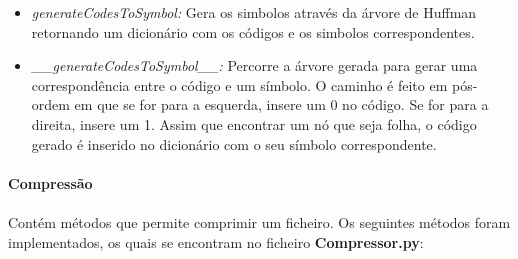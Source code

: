 \documentclass[paper=a4, fontsize=11pt]{scrartcl}
\numberwithin{equation}{section}		%
\numberwithin{figure}{section}			%
\numberwithin{table}{section}				%
\begin{document}
\begin{itemize}
  \item {\it generateCodesToSymbol:} Gera os simbolos através da árvore de Huffman retornando um dicionário com os códigos e os simbolos correspondentes.
  
  \item {\it \_\_generateCodesToSymbol\_\_:} Percorre a árvore gerada para gerar uma correspondência entre o código e um símbolo. O caminho é feito em pós-ordem em que se for para a esquerda, insere um 0 no código. Se for para a direita, insere um 1. Assim que encontrar um nó que seja folha, o código gerado é inserido no dicionário com o seu símbolo correspondente.
  
\end{itemize}
\pagebreak 			%

\paragraph{Compressão}
\paragraph{}Contém métodos que permite comprimir um ficheiro. Os seguintes métodos foram implementados, os quais se encontram no ficheiro {\bf Compressor.py}:\\
\end{document}
